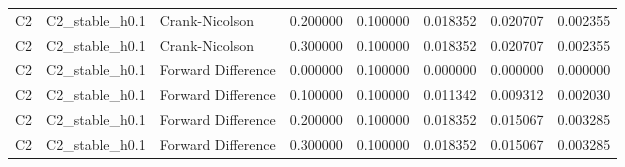 \begin{tabular}{llllllll}
C2 & C2\_stable\_h0.1 & Crank-Nicolson & 0.200000 & 0.100000 & 0.018352 & 0.020707 & 0.002355 \\
C2 & C2\_stable\_h0.1 & Crank-Nicolson & 0.300000 & 0.100000 & 0.018352 & 0.020707 & 0.002355 \\
C2 & C2\_stable\_h0.1 & Forward Difference & 0.000000 & 0.100000 & 0.000000 & 0.000000 & 0.000000 \\
C2 & C2\_stable\_h0.1 & Forward Difference & 0.100000 & 0.100000 & 0.011342 & 0.009312 & 0.002030 \\
C2 & C2\_stable\_h0.1 & Forward Difference & 0.200000 & 0.100000 & 0.018352 & 0.015067 & 0.003285 \\
C2 & C2\_stable\_h0.1 & Forward Difference & 0.300000 & 0.100000 & 0.018352 & 0.015067 & 0.003285 \\
\bottomrule
\end{tabular}
